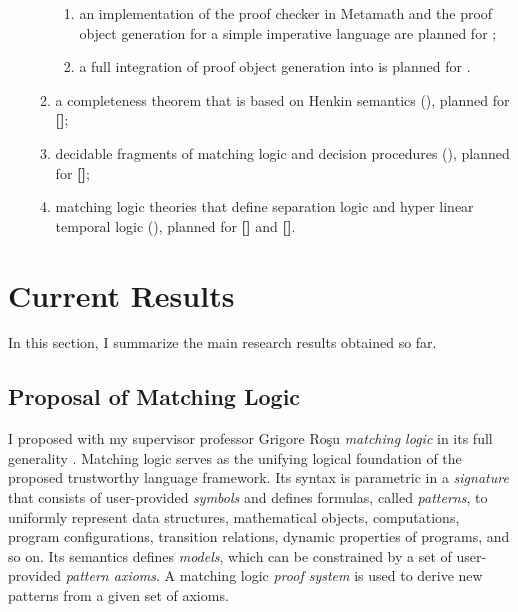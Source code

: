 \documentclass[11pt]{article}
\begin{document}
\begin{itemize}
\begin{enumerate}
\begin{enumerate}
\item an implementation of the proof checker in Metamath and the proof object generation for a simple imperative language are planned for \textbf{\plan{[CAV2021]}};
\item a full integration of proof object generation into \K is planned for
\textbf{\plan{[PLDI2022]}}.
\end{enumerate}
\item a completeness theorem that is based on Henkin semantics (), planned for \textbf{[]};
\item decidable fragments of matching logic and decision procedures 
(), planned for \textbf{[]};
\item matching logic theories that define separation logic and hyper linear 
temporal logic (), planned for \textbf{[]} and \textbf{[]}.
\end{enumerate}
\end{itemize}

\section{Current Results}
\label{sec:current}

In this section, I summarize the main research results obtained so far. 

\subsection{Proposal of Matching Logic}
\label{sec:ml}

I proposed with my supervisor professor Grigore Ro\c{s}u \emph{matching logic}
in its full generality \cite{CR19}. 
Matching logic serves as the unifying logical foundation of the proposed 
trustworthy language framework. 
Its syntax is parametric in a \emph{signature} that consists of 
user-provided \emph{symbols} and defines formulas, called \emph{patterns}, to 
uniformly represent
data structures, mathematical objects, computations, program configurations,
transition relations, dynamic properties of programs, and so on. 
Its semantics defines \emph{models}, which can be constrained by
a set of user-provided \emph{pattern axioms}. 
A matching logic \emph{proof system} is used to derive new patterns from a 
given set of axioms. 
\end{document}

